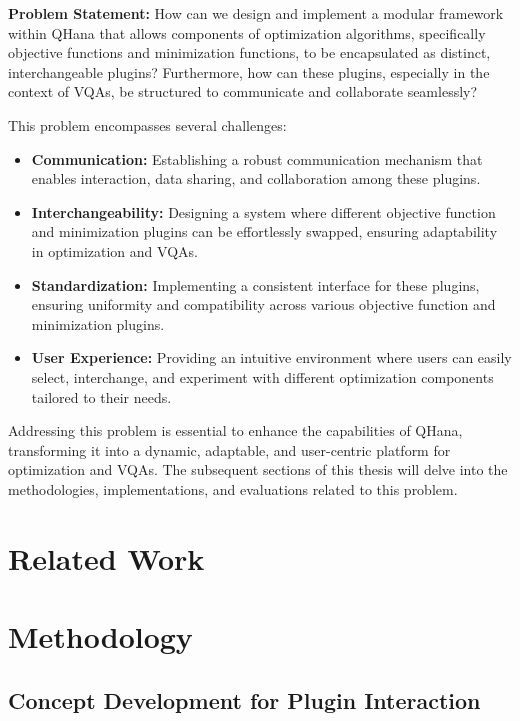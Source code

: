 \documentclass[
  a4paper,  %
  twoside,  %
  bibliography=totoc,
  headsepline,
  cleardoublepage=empty,
  parskip=half,
  draft=false
]{scrbook}
\begin{document}
\textbf{Problem Statement:}
How can we design and implement a modular framework within QHana that allows components of optimization algorithms, specifically objective functions and minimization functions, to be encapsulated as distinct, interchangeable plugins?
Furthermore, how can these plugins, especially in the context of VQAs, be structured to communicate and collaborate seamlessly?

This problem encompasses several challenges:

\begin{itemize}
    \item \textbf{Communication:} Establishing a robust communication mechanism that enables interaction, data sharing, and collaboration among these plugins.
    \item \textbf{Interchangeability:} Designing a system where different objective function and minimization plugins can be effortlessly swapped, ensuring adaptability in optimization and VQAs.
    \item \textbf{Standardization:} Implementing a consistent interface for these plugins, ensuring uniformity and compatibility across various objective function and minimization plugins.
    \item \textbf{User Experience:} Providing an intuitive environment where users can easily select, interchange, and experiment with different optimization components tailored to their needs.
\end{itemize}

Addressing this problem is essential to enhance the capabilities of QHana, transforming it into a dynamic, adaptable, and user-centric platform for optimization and VQAs.
The subsequent sections of this thesis will delve into the methodologies, implementations, and evaluations related to this problem.

\chapter{Related Work}

\cite{Beisel2023} \cite{Beisel2023a} \cite{Thullier2021}

\chapter{Methodology}
\label{chap:methodology}
\section{Concept Development for Plugin Interaction}
\label{sec:conceptDevelopment}
\end{document}
